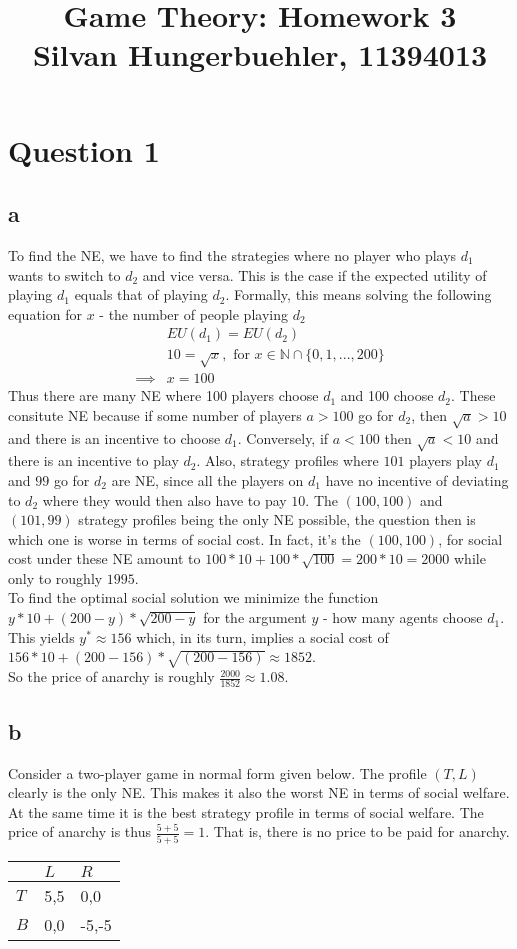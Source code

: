 \documentclass[10pt,a4paper]{article}
\title{%
  Game Theory: Homework 3 \\
  \large Silvan Hungerbuehler, 11394013}
\date{}
\begin{document}
\maketitle

\section*{Question 1}
\subsection*{a}
To find the NE, we have to find the strategies where no player who plays $d_1$ wants to switch to $d_2$ and vice versa. This is the case if the expected utility of playing $d_1$ equals that of playing $d_2$. Formally, this means solving the following equation for $x$ - the number of people playing $d_2$
\begin{align*}
&EU(d_1)=EU(d_2)\\
&10=\sqrt{x}, \text{ for } x\in \mathbb{N}\cap \{0,1,...,200\}\\
\implies &x = 100
\end{align*}
Thus there are many NE where 100 players choose $d_1$ and 100 choose $d_2$. These consitute NE because if some number of players $a>100$ go for $d_2$, then $\sqrt{a}>10$ and there is an incentive to choose $d_1$. Conversely, if $a<100$ then $\sqrt{a}<10$ and there is an incentive to play $d_2$. Also, strategy profiles where $101$ players play $d_1$ and $99$ go for $d_2$ are NE, since all the players on $d_1$ have no incentive of deviating to $d_2$ where they would then also have to pay $10$. The $(100,100)$ and $(101,99)$ strategy profiles being the only NE possible, the question then is which one is worse in terms of social cost. In fact, it's the $(100,100)$, for social cost under these NE amount to $100*10+100*\sqrt{100}=200*10=2000$ while only to roughly $1995$.\\
To find the optimal social solution we minimize the function $y*10+(200-y) * \sqrt{200-y}$ for the argument $y$ - how many agents choose $d_1$.
 This yields $y^* \approx 156$ which,  in its turn, implies a social cost of $156 * 10 + (200-156)* \sqrt{(200-156)} \approx 1852$.\\
So the price of anarchy is roughly $\tfrac{2000}{1852}\approx 1.08$.
\subsection*{b}
Consider a two-player game in normal form given below. The profile $(T,L)$ clearly is the only NE. This makes it also the worst NE in terms of social welfare. At the same time it is the best strategy profile in terms of social welfare. The price of anarchy is thus $\tfrac{5+5}{5+5}=1$. That is, there is no price to be paid for anarchy.
\begin{table}[h]
\begin{tabular}{|l|l|l|}
\hline
          & $L$ & $R$  \\ \hline
$T$     & 5,5   & 0,0   \\ \hline
$B$     & 0,0  & -5,-5  \\ \hline
\end{tabular}
\end{table}
\end{document}
